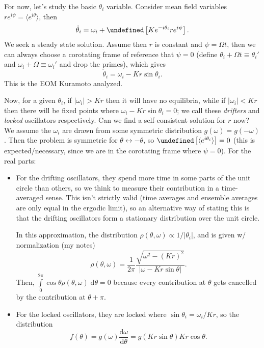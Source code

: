 \documentclass[11pt,
        usenames, %
        dvipsnames %
    ]{article}
\newcommand*{\rd}[2]{\frac{\mathrm{d}#1}{\mathrm{d}#2}}
\newcommand*{\abs}[1]{\left|#1\right|}
\newcommand*{\ev}[1]{\langle#1\rangle}
\newcommand*{\p}[1]{\left(#1\right)}
\newcommand*{\s}[1]{\left[#1\right]}
\let\Im\undefined
\DeclareMathOperator{\Im}{Im}
\begin{document}
For now, let's study the basic $\theta_i$ variable. Consider mean field
variables $re^{i\psi} = \ev{e^{i\theta}}$, then
\begin{equation}
    \dot{\theta}_i = \omega_i + \Im\s{K e^{-i\theta_i} re^{i\psi}}.
\end{equation}
We seek a steady state solution. Assume then $r$ is constant and $\psi = \Omega
t$, then we can always choose a corotating frame of reference that $\psi = 0$
(define $\theta_i + \Omega t \equiv \theta_i'$ and $\omega_i + \Omega \equiv
\omega_i'$ and drop the primes), which gives
\begin{equation}
    \dot{\theta}_i = \omega_i - Kr\sin \theta_i.
\end{equation}
This is the EOM Kuramoto analyzed.

Now, for a given $\theta_i$, if $\abs{\omega_i} > Kr$ then it will have no
equilibria, while if $\abs{\omega_i} < Kr$ then there will be fixed points where
$\omega_i - Kr\sin \theta_i = 0$; we call these \emph{drifters} and
\emph{locked} oscillators respectively. Can we find a self-consistent solution
for $r$ now? We assume the $\omega_i$ are drawn from some symmetric distribution
$g(\omega) = g(-\omega)$. Then the problem is symmetric for $\theta
\leftrightarrow -\theta$, so $\Im\s{\ev{e^{i\theta_i}}} = 0$ (this is
expected/necessary, since we are in the corotating frame where $\psi = 0$). For
the real parts:
\begin{itemize}
    \item For the drifting oscillators, they spend more time in some parts of
        the unit circle than others, so we think to measure their contribution
        in a time-averaged sense. This isn't strictly valid (time averages and
        ensemble averages are only equal in the ergodic limit), so an
        alternative way of stating this is that the drifting oscillators form a
        stationary distribution over the unit circle.

        In this approximation, the distribution $\rho(\theta, \omega) \propto 1
        / \abs{\theta_i}$, and is given w/ normalization (my notes)
        \begin{equation}
            \rho\p{\theta, \omega} = \frac{1}{2\pi}
                \frac{\sqrt{\omega^2 - (Kr)^2}}{\abs{\omega - Kr\sin \theta}}.
        \end{equation}
        Then, $\int\limits_0^{2\pi} \cos \theta \rho(\theta,
        \omega)\;\mathrm{d}\theta = 0$ because every contribution at $\theta$
        gets cancelled by the contribution at $\theta + \pi$.

    \item For the locked oscillators, they are locked where $\sin \theta_i =
        \omega_i / Kr$, so the distribution
        \begin{equation}
            f(\theta) = g(\omega) \rd{\omega}{\theta} = g\p{Kr \sin \theta}
                Kr \cos \theta.
        \end{equation}
\end{itemize}
\end{document}
